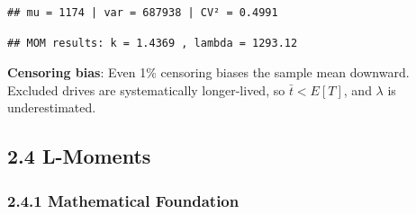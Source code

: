 \documentclass[
]{article}
\newenvironment{Shaded}{\begin{snugshade}}{\end{snugshade}}
\newcommand{\AttributeTok}[1]{\textcolor[rgb]{0.13,0.29,0.53}{#1}}
\newcommand{\CommentTok}[1]{\textcolor[rgb]{0.56,0.35,0.01}{\textit{#1}}}
\newcommand{\ControlFlowTok}[1]{\textcolor[rgb]{0.13,0.29,0.53}{\textbf{#1}}}
\newcommand{\DecValTok}[1]{\textcolor[rgb]{0.00,0.00,0.81}{#1}}
\newcommand{\FloatTok}[1]{\textcolor[rgb]{0.00,0.00,0.81}{#1}}
\newcommand{\FunctionTok}[1]{\textcolor[rgb]{0.13,0.29,0.53}{\textbf{#1}}}
\newcommand{\NormalTok}[1]{#1}
\newcommand{\OtherTok}[1]{\textcolor[rgb]{0.56,0.35,0.01}{#1}}
\newcommand{\SpecialCharTok}[1]{\textcolor[rgb]{0.81,0.36,0.00}{\textbf{#1}}}
\newcommand{\StringTok}[1]{\textcolor[rgb]{0.31,0.60,0.02}{#1}}
\begin{document}
\begin{verbatim}
## mu = 1174 | var = 687938 | CV² = 0.4991
\end{verbatim}

\begin{Shaded}
\end{Shaded}

\begin{verbatim}
## MOM results: k = 1.4369 , lambda = 1293.12
\end{verbatim}

\textbf{Censoring bias}: Even 1\% censoring biases the sample mean
downward. Excluded drives are systematically longer-lived, so
\(\bar{t} < E[T]\), and \(\lambda\) is underestimated.

\subsection{2.4 L-Moments}\label{l-moments}

\subsubsection{2.4.1 Mathematical
Foundation}\label{mathematical-foundation-3}
\end{document}
